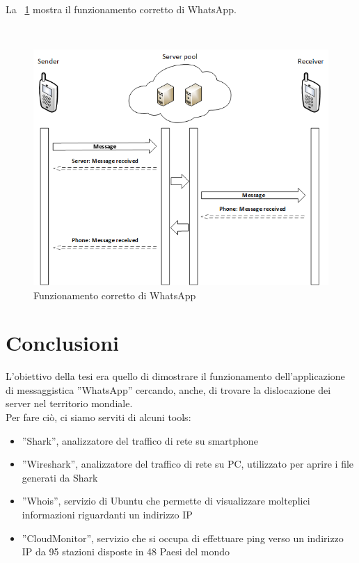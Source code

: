 \documentclass[a4paper,11pt]{book}
\begin{document}
La \figurename ~\ref{fig:lan} mostra il funzionamento corretto di WhatsApp.  

~

\begin{figure}[!ht]
\centering
\includegraphics[scale = 0.8]{true_lan.png}
\caption{Funzionamento corretto di WhatsApp}
\label{fig:lan}
\end{figure}



\chapter{Conclusioni}
L'obiettivo della tesi era quello di dimostrare il funzionamento dell'applicazione di messaggistica ''WhatsApp'' cercando, anche, di trovare la dislocazione dei server nel territorio mondiale.\\
Per fare ci\`o, ci siamo serviti di alcuni tools:
\begin{itemize}
\item ''Shark'', analizzatore del traffico di rete su smartphone 
\item ''Wireshark'', analizzatore del traffico di rete su PC, utilizzato per aprire i file generati da Shark
\item ''Whois'', servizio di Ubuntu che permette di visualizzare molteplici informazioni riguardanti un indirizzo IP
\item ''CloudMonitor'', servizio che si occupa di effettuare ping verso un indirizzo IP da 95 stazioni disposte in 48 Paesi del mondo
\end{itemize}
\end{document}
